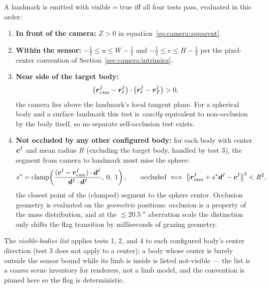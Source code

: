 A landmark is emitted with $\mathrm{visible} = \mathrm{true}$ iff all
four tests pass, evaluated in this order:
\begin{enumerate}
  \item \textbf{In front of the camera:} $Z > 0$ in
    equation~\eqref{eq:camera:apparent}.
  \item \textbf{Within the sensor:} $-\tfrac12 \le u \le W - \tfrac12$
    and $-\tfrac12 \le v \le H - \tfrac12$ per the pixel-center
    convention of Section~\ref{sec:camera:intrinsics}.
  \item \textbf{Near side of the target body:}
    \begin{equation}
      \bigl(\bm{r}_{\mathrm{cam}}^{I} - \bm{r}_{\ell}^{I}\bigr) \cdot
      \bigl(\bm{r}_{\ell}^{I} - \bm{r}_{T}^{I}\bigr) > 0 ,
      \label{eq:camera:nearside}
    \end{equation}
    the camera lies above the landmark's local tangent plane. For a
    spherical body and a surface landmark this test is \emph{exactly}
    equivalent to non-occlusion by the body itself, so no separate
    self-occlusion test exists.
  \item \textbf{Not occluded by any other configured body:} for each
    body with center $\bm{c}^{I}$ and mean radius $R$ (excluding the
    target body, handled by test 3), the segment from camera to
    landmark must miss the sphere:
    \begin{equation}
      s^{*} = \operatorname{clamp}\!\left(
        \frac{(\bm{c}^{I} - \bm{r}_{\mathrm{cam}}^{I}) \cdot \bm{d}^{I}}
             {\bm{d}^{I} \cdot \bm{d}^{I}},\; 0,\; 1\right),
      \qquad
      \text{occluded} \iff
      \bigl\lVert \bm{r}_{\mathrm{cam}}^{I} + s^{*}\bm{d}^{I}
        - \bm{c}^{I} \bigr\rVert^2 < R^2 ,
      \label{eq:camera:occlusion}
    \end{equation}
    the closest point of the (clamped) segment to the sphere center.
    Occlusion geometry is evaluated on the \emph{geometric} positions:
    occlusion is a property of the mass distribution, and at the
    $\lesssim \qty{20.5}{\arcsecond}$ aberration scale the distinction
    only shifts the flag transition by milliseconds of grazing
    geometry.
\end{enumerate}
The \emph{visible-bodies list} applies tests 1, 2, and 4 to each
configured body's center direction (test 3 does not apply to a center);
a body whose center is barely outside the sensor bound while its limb is
inside is listed not-visible --- the list is a coarse scene inventory
for renderers, not a limb model, and the convention is pinned here so
the flag is deterministic.

